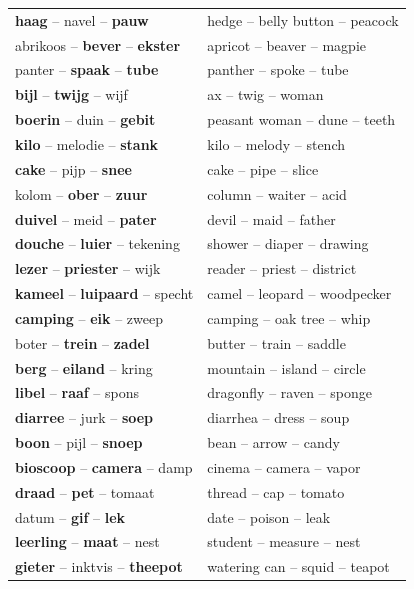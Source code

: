 \documentclass[doc]{apa6}
\begin{document}
\begin{appendix}
\begin{small}
\begin{longtable}{ll}
\textbf{haag} -- navel -- \textbf{pauw} & hedge -- belly button -- peacock\\
abrikoos -- \textbf{bever} -- \textbf{ekster} & apricot -- beaver -- magpie\\
panter -- \textbf{spaak} -- \textbf{tube} & panther -- spoke -- tube\\
\textbf{bijl} -- \textbf{twijg} -- wijf & ax -- twig -- woman\\
\textbf{boerin} -- duin -- \textbf{gebit} & peasant woman -- dune -- teeth\\
\textbf{kilo} -- melodie -- \textbf{stank} & kilo -- melody -- stench\\
\textbf{cake} -- pijp -- \textbf{snee} & cake -- pipe -- slice\\
kolom -- \textbf{ober} -- \textbf{zuur} & column -- waiter -- acid\\
\textbf{duivel} -- meid -- \textbf{pater} & devil -- maid -- father\\
\textbf{douche} -- \textbf{luier} -- tekening & shower -- diaper -- drawing\\
\textbf{lezer} -- \textbf{priester} -- wijk & reader -- priest -- district\\
\textbf{kameel} -- \textbf{luipaard} -- specht & camel -- leopard -- woodpecker\\
\textbf{camping} -- \textbf{eik} -- zweep & camping -- oak tree -- whip\\
boter -- \textbf{trein} -- \textbf{zadel} & butter -- train -- saddle\\
\textbf{berg} -- \textbf{eiland} -- kring & mountain -- island -- circle\\
\textbf{libel} -- \textbf{raaf} -- spons & dragonfly -- raven -- sponge\\
\textbf{diarree} -- jurk -- \textbf{soep} & diarrhea -- dress -- soup\\
\textbf{boon} -- pijl -- \textbf{snoep} & bean -- arrow -- candy\\
\textbf{bioscoop} -- \textbf{camera} -- damp & cinema -- camera -- vapor\\
\textbf{draad} -- \textbf{pet} -- tomaat & thread -- cap -- tomato\\
datum -- \textbf{gif} -- \textbf{lek} & date -- poison -- leak\\
\textbf{leerling} -- \textbf{maat} -- nest & student -- measure -- nest\\
\textbf{gieter} -- inktvis -- \textbf{theepot} & watering can -- squid -- teapot\\

\end{longtable}
\end{small}
\end{appendix}
\end{document}
